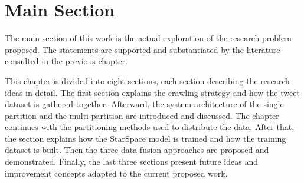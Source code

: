 \chapter{Main Section}

The main section of this work is the actual exploration of the research problem proposed. The statements are supported and substantiated by the literature consulted in the previous chapter.

This chapter is divided into eight sections, each section describing the research ideas in detail. The first section explains the crawling strategy and how the tweet dataset is gathered together. Afterward, the system architecture of the single partition and the multi-partition are introduced and discussed. The chapter continues with the partitioning methods used to distribute the data. After that, the section explains how the StarSpace model is trained and how the training dataset is built. Then the three data fusion approaches are proposed and demonstrated. Finally, the last three sections present future ideas and improvement concepts adapted to the current proposed work.
